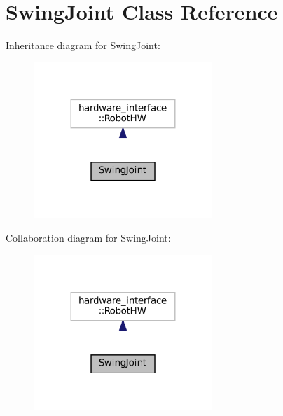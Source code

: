 \hypertarget{classSwingJoint}{}\section{Swing\+Joint Class Reference}
\label{classSwingJoint}


Inheritance diagram for Swing\+Joint\+:
\nopagebreak
\begin{figure}[H]
\begin{center}
\leavevmode
\includegraphics[width=191pt]{classSwingJoint__inherit__graph}
\end{center}
\end{figure}


Collaboration diagram for Swing\+Joint\+:
\nopagebreak
\begin{figure}[H]
\begin{center}
\leavevmode
\includegraphics[width=191pt]{classSwingJoint__coll__graph}
\end{center}
\end{figure}
